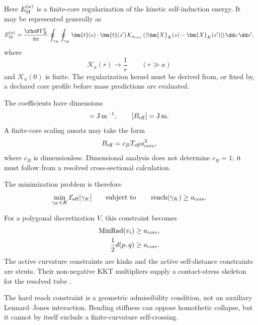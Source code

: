 Here \(E_{\rm SI}^{(a)}\) is a finite-core regularization of the kinetic
self-induction energy.  It may be represented generally as
\begin{equation}
E_{\rm SI}^{(a)}
=
\frac{\rhoF\Gamma_K^2}{8\pi}
\oint_{\gamma_K}
\oint_{\gamma_K}
\bm{t}(s)\cdot\bm{t}(s')\,
\mathcal{K}_{a_{\rm core}}
\left(
\left|
\bm{X}_K(s)-\bm{X}_K(s')
\right|
\right)
\dd s\,\dd s',
\label{eq:RT-regularized-self-induction}
\end{equation}
where
\begin{equation}
\mathcal{K}_{a}(r)
\longrightarrow
\frac{1}{r}
\qquad
(r\gg a)
\end{equation}
and \(\mathcal{K}_{a}(0)\) is finite.  The regularization kernel must be
derived from, or fixed by, a declared core profile before mass predictions
are evaluated.

The coefficients have dimensions
\begin{equation}
[T_{\rm eff}]
=
\mathrm{J\,m^{-1}},
\qquad
[B_{\rm eff}]
=
\mathrm{J\,m}.
\end{equation}
A finite-core scaling ansatz may take the form
\begin{equation}
B_{\rm eff}
=
c_B T_{\rm eff}a_{\rm core}^2,
\label{eq:RT-bending-scaling}
\end{equation}
where \(c_B\) is dimensionless.  Dimensional analysis does not determine
\(c_B=1\); it must follow from a resolved cross-sectional calculation.

The minimization problem is therefore
\begin{equation}
\min_{\gamma_K\in K}
\mathcal{E}_{\rm eff}[\gamma_K]
\qquad
\text{subject to}
\qquad
\operatorname{reach}(\gamma_K)
\geq
a_{\rm core}.
\label{eq:RT-constrained-minimization}
\end{equation}

For a polygonal discretization \(V\), this constraint becomes
\begin{align}
\operatorname{MinRad}(v_i)
&\geq
a_{\rm core},
\\
\frac{1}{2}d(p,q)
&\geq
a_{\rm core}.
\end{align}
The active curvature constraints are kinks and the active self-distance
constraints are struts.  Their non-negative KKT multipliers supply a
contact-stress skeleton for the resolved tube
\cite{AshtonCantarellaPiatekRawdon2011}.

The hard reach constraint is a geometric admissibility condition, not an
auxiliary Lennard--Jones interaction.  Bending stiffness can oppose
homothetic collapse, but it cannot by itself exclude a finite-curvature
self-crossing.

